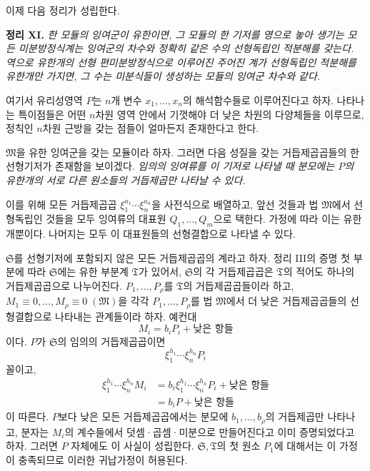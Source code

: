 이제 다음 정리가 성립한다.

\textbf{정리 XI.} \emph{한 모듈의 잉여군이 유한이면, 그 모듈의 한 기저를 영으로 놓아 생기는 모든 미분방정식계는 잉여군의 차수와 정확히 같은 수의 선형독립인 적분해를 갖는다. 역으로 유한개의 선형 편미분방정식으로 이루어진 주어진 계가 선형독립인 적분해를 유한개만 가지면, 그 수는 미분식들이 생성하는 모듈의 잉여군 차수와 같다.}

여기서 유리성영역 \(P\)는 \(n\)개 변수 \(x_1,\ldots,x_n\)의 해석함수들로 이루어진다고 하자. 나타나는 특이점들은 어떤 \(n\)차원 영역 안에서 기껏해야 더 낮은 차원의 다양체들을 이루므로, 정칙인 \(n\)차원 근방을 갖는 점들이 얼마든지 존재한다고 한다.

\(\mathfrak M\)을 유한 잉여군을 갖는 모듈이라 하자. 그러면 다음 성질을 갖는 거듭제곱곱들의 한 선형기저가 존재함을 보이겠다. \emph{임의의 잉여류를 이 기저로 나타낼 때 분모에는 \(P\)의 유한개의 서로 다른 원소들의 거듭제곱만 나타날 수 있다.}

이를 위해 모든 거듭제곱곱 \(\xi_1^{a_1}\cdots\xi_n^{a_n}\)을 사전식으로 배열하고, 앞선 것들과 법 \(\mathfrak M\)에서 선형독립인 것들을 모두 잉여류의 대표원 \(Q_1,\ldots,Q_m\)으로 택한다. 가정에 따라 이는 유한개뿐이다. 나머지는 모두 이 대표원들의 선형결합으로 나타낼 수 있다.

\(\mathfrak S\)를 선형기저에 포함되지 않은 모든 거듭제곱곱의 계라고 하자. 정리 III의 증명 첫 부분에 따라 \(\mathfrak S\)에는 유한 부분계 \(\mathfrak T\)가 있어서, \(\mathfrak S\)의 각 거듭제곱곱은 \(\mathfrak T\)의 적어도 하나의 거듭제곱곱으로 나누어진다. \(P_1,\ldots,P_\rho\)를 \(\mathfrak T\)의 거듭제곱곱들이라 하고, \(M_1\equiv0,\ldots,M_\rho\equiv0\;(\mathfrak M)\)을 각각 \(P_1,\ldots,P_\rho\)를 법 \(\mathfrak M\)에서 더 낮은 거듭제곱곱들의 선형결합으로 나타내는 관계들이라 하자. 예컨대
\[
 M_i=b_iP_i+\text{낮은 항들}
\]
이다. \(P\)가 \(\mathfrak S\)의 임의의 거듭제곱곱이면
\[
 \xi_1^{h_1}\cdots\xi_n^{h_n}P_i
\]
꼴이고,
\[
\begin{aligned}
 \xi_1^{h_1}\cdots\xi_n^{h_n}M_i
 &=b_i\xi_1^{h_1}\cdots\xi_n^{h_n}P_i
   +\text{낮은 항들}\\
 &=b_iP+\text{낮은 항들}
\end{aligned}
\]
이 따른다. \(P\)보다 낮은 모든 거듭제곱곱에서는 분모에 \(b_1,\ldots,b_\rho\)의 거듭제곱만 나타나고, 분자는 \(M_i\)의 계수들에서 덧셈·곱셈·미분으로 만들어진다고 이미 증명되었다고 하자. 그러면 \(P\) 자체에도 이 사실이 성립한다. \(\mathfrak S,\mathfrak T\)의 첫 원소 \(P_1\)에 대해서는 이 가정이 충족되므로 이러한 귀납가정이 허용된다.

